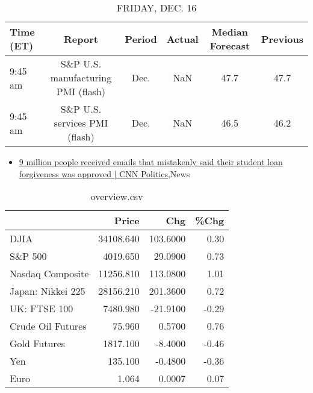 \documentclass{article}%
\begin{document}
%


\begin{table}[htbp]%
\caption{FRIDAY, DEC. 16}%
\centering%
\begin{adjustbox}{width=1\textwidth}%
\begin{tabular}{lccccc}
\toprule
Time (ET) &                             Report & Period & Actual & Median Forecast & Previous \\
\midrule
  9:45 am & S\&P U.S. manufacturing PMI (flash) &   Dec. &    NaN &            47.7 &     47.7 \\
  9:45 am &      S\&P U.S. services PMI (flash) &   Dec. &    NaN &            46.5 &     46.2 \\
\bottomrule
\end{tabular}
%
\end{adjustbox}%
\end{table}

%
\begin{itemize}%
\item%
\href{https://reddit.com/r/Economics/comments/zlkapa/9\_million\_people\_received\_emails\_that\_mistakenly/}{9 million people received emails that mistakenly said their student loan forgiveness was approved | CNN Politics},News%
\end{itemize}%


\begin{table}[htbp]%
\caption{overview.csv}%
\centering%
\begin{adjustbox}{width=1\textwidth}%
\begin{tabular}{lrrr}
\toprule
                  &     Price &      Chg &  \%Chg \\
\midrule
             DJIA & 34108.640 & 103.6000 &  0.30 \\
          S\&P 500 &  4019.650 &  29.0900 &  0.73 \\
 Nasdaq Composite & 11256.810 & 113.0800 &  1.01 \\
Japan: Nikkei 225 & 28156.210 & 201.3600 &  0.72 \\
     UK: FTSE 100 &  7480.980 & -21.9100 & -0.29 \\
Crude Oil Futures &    75.960 &   0.5700 &  0.76 \\
     Gold Futures &  1817.100 &  -8.4000 & -0.46 \\
              Yen &   135.100 &  -0.4800 & -0.36 \\
             Euro &     1.064 &   0.0007 &  0.07 \\
\bottomrule
\end{tabular}
%
\end{adjustbox}%
\end{table}
\end{document}

